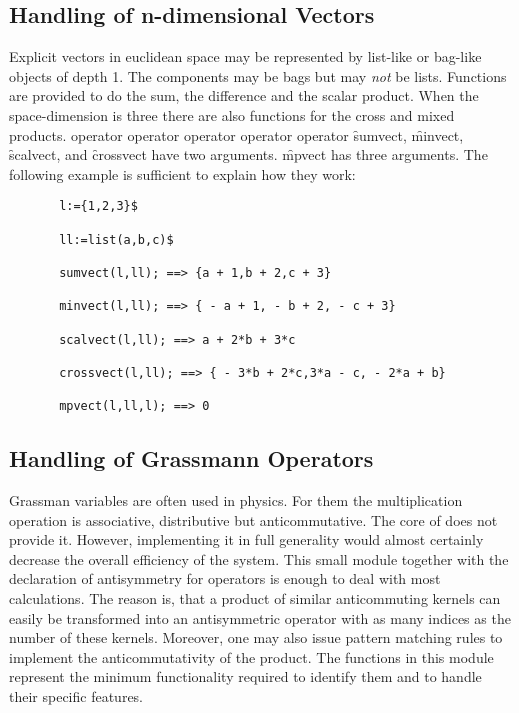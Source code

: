 \subsection{Handling of n-dimensional Vectors}
Explicit vectors in  euclidean space may be represented by
list-like or bag-like objects of depth 1.
The components may be bags but may \emph{not} be lists.
Functions are provided to do the sum, the difference and the
scalar product. When the space-dimension is three there are also functions
for the cross and mixed products.
 {operator}
 {operator}
 {operator}
 {operator}
 {operator}
\hypertarget{operator:SUMVECT}{}
\hypertarget{operator:MINVECT}{}
\hypertarget{operator:SCALVECT}{}
\hypertarget{operator:CROSSVECT}{}
\hypertarget{operator:MPVECT}{}
\f{sumvect}, \f{minvect}, \f{scalvect}, and \f{crossvect} have two arguments.
\f{mpvect} has three arguments. The following example
is sufficient to explain how they work:
\begin{verbatim}
       l:={1,2,3}$

       ll:=list(a,b,c)$

       sumvect(l,ll); ==> {a + 1,b + 2,c + 3}

       minvect(l,ll); ==> { - a + 1, - b + 2, - c + 3}

       scalvect(l,ll); ==> a + 2*b + 3*c

       crossvect(l,ll); ==> { - 3*b + 2*c,3*a - c, - 2*a + b}

       mpvect(l,ll,l); ==> 0
\end{verbatim}
\subsection{Handling of Grassmann Operators}
Grassman variables are often used in physics. For them the multiplication
operation is associative, distributive but anticommutative. The
core of \REDUCE does not provide it. However, implementing
it in full generality would almost
certainly decrease the overall efficiency of the system. This small
module together with the declaration of antisymmetry for operators is
enough to deal with most calculations. The reason is, that a
product of similar anticommuting kernels can easily  be transformed
into an antisymmetric operator with as many indices as the number of
these kernels. Moreover, one may also issue pattern matching rules
to implement the anticommutativity of the product.
The functions in this module represent the minimum functionality
required to identify them and to handle their specific features.

